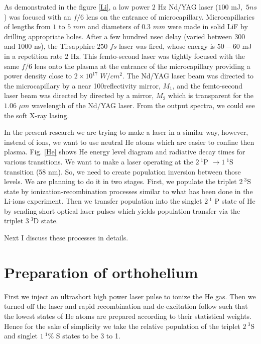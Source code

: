 \documentclass[preprint,preprintnumbers]{revtex4}
\begin{document}

As demonstrated in the figure \ref{Li}, a low power $2$ Hz Nd/YAG laser ($100
$ mJ$,$ $5ns$) was focused with an $f/6$ lens on the entrance of
microcapillary. Microcapillaries of lengths from $1$ to $5$ $mm$ and
diameters of $0.3$ $mm$ were made in solid LiF by drilling appropriate
holes. After a few hundred nsec delay (varied between 300 and 1000 ns), the
Ti:sapphire $250$ $fs$ laser was fired, whose energy is $50-60$ mJ in a
repetition rate $2$ Hz. This femto-second laser was tightly focused with the
same $f/6$ lens onto the plasma at the entrance of the microcapillary
providing a power density close to $2\times 10^{17}$ $W/{cm}^{2}$. The
Nd/YAG laser beam was directed to the microcapillary by a near
100reflectivity mirror, $M_{1}$, and the femto-second laser beam was
directed by directed by a mirror, $M_{2}$ which is transparent for the $1.06$
$\mu m$ wavelength of the Nd/YAG laser. From the output spectra, we could
see the soft X-ray lasing.

In the present research we are trying to make a laser in a similar way,
however, instead of ions, we want to use neutral He atoms which are easier
to confine then plasma. Fig. \ref{He} shows He energy level diagram and
radiative decay times for various transitions. We want to make a laser
operating at the $2~^{1}$P $\rightarrow 1~^{1}$S transition ($58$ nm). So,
we need to create population inversion between those levels. We are planning
to do it in two stages. First, we populate the triplet $2~^{3}\text{S}$
state by ionization-recombination processes similar to what has been done in
the Li-ions experiment. Then we transfer population into the singlet $2~^{1}$%
P state of He by sending short optical laser pulses which yields population
transfer via the triplet $3~^{3}$D state.

Next I discuss these processes in details.

\section{Preparation of orthohelium}

First we inject an ultrashort high power laser pulse to ionize the He gas.
Then we turned off the laser and rapid recombination and de-excitation
follow such that the lowest states of He atoms are prepared according to
their statistical weights. Hence for the sake of simplicity we take the
relative population of the triplet $2~^{3}\text{S}$ and singlet $1~^{1}\text{%
S}$ states to be 3 to 1.
\end{document}
